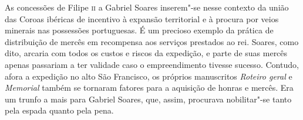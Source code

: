 As concessões de Filipe \textsc{ii} a Gabriel Soares inserem"-se nesse contexto da
união das Coroas ibéricas de incentivo à expansão territorial e à
procura por veios minerais nas possessões portuguesas. É um precioso
exemplo da prática de distribuição de mercês em recompensa aos serviços
prestados ao rei. Soares, como dito, arcaria com todos os custos e
riscos da expedição, e parte de suas mercês apenas passariam a ter
validade caso o empreendimento tivesse sucesso. Contudo, afora a
expedição no alto São Francisco, os próprios manuscritos
\textit{Roteiro geral} e \textit{Memorial} também se tornaram fatores
para a aquisição de honras e mercês. Era um trunfo a mais para Gabriel
Soares, que, assim, procurava nobilitar"-se tanto pela espada quanto
pela pena.


